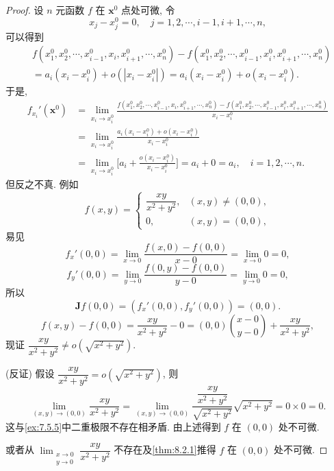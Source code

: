 \begin{proof}
设 $n$ 元函数 $f$ 在 $\boldsymbol{x}^{0}$ 点处可微, 令
\[
  x_{j} - x_{j}^{0} = 0, \quad j = 1, 2, \cdots, i - 1, i + 1, \cdots, n,
\]
可以得到
\begin{align*}
  &f(x_{1}^{0}, x_{2}^{0}, \cdots, x_{i-1}^{0}, x_{i}, x_{i+1}^{0}, \cdots, x_{n}^{0}) - f(x_{1}^{0}, x_{2}^{0}, \cdots, x_{i-1}^{0}, x_{i}^{0}, x_{i+1}^{0}, \cdots, x_{n}^{0}) \\
  &= a_{i}(x_{i} - x_{i}^{0}) + o(|x_{i} - x_{i}^{0}|) = a_{i}(x_{i} - x_{i}^{0}) + o(x_{i} - x_{i}^{0}).
\end{align*}
于是,
\begin{align*}
  f_{x_{i}}'(\boldsymbol{x}^{0})
  &= \lim_{x_{i} \to x_{i}^{0}}\frac{f(x_{1}^{0}, x_{2}^{0}, \cdots, x_{i-1}^{0}, x_{i}, x_{i+1}^{0}, \cdots, x_{n}^{0}) - f(x_{1}^{0}, x_{2}^{0}, \cdots, x_{i-1}^{0}, x_{i}^{0}, x_{i+1}^{0}, \cdots, x_{n}^{0})}{x_{i} - x_{i}^{0}} \\
  &= \lim_{x_{i} \to x_{i}^{0}}\frac{a_{i}(x_{i} - x_{i}^{0}) + o(x_{i} - x_{i}^{0})}{x_{i} - x_{i}^{0}} \\
  &= \lim_{x_{i} \to x_{i}^{0}}\Big[a_{i} + \frac{o(x_{i} - x_{i}^{0})}{x_{i} - x_{i}^{0}}\Big] = a_{i} + 0 = a_{i}, \quad i = 1, 2, \cdots, n.
\end{align*}
但反之不真. 例如
\[
  f(x, y) = \begin{cases}
    \dfrac{xy}{x^{2} + y^{2}}, & (x, y) \neq (0, 0), \\[2.5mm]
    0, & (x, y) = (0, 0),
  \end{cases}
\]
易见
\[
  f_{x}'(0, 0) = \lim_{x \to 0}\frac{f(x, 0) - f(0, 0)}{x - 0} = \lim_{x \to 0}0 = 0,
\]
\[
  f_{y}'(0, 0) = \lim_{y \to 0}\frac{f(0, y) - f(0, 0)}{y - 0} = \lim_{y \to 0}0 = 0,
\]
所以
\[
  \boldsymbol{J}f(0, 0) = (f_{x}'(0, 0), f_{y}'(0, 0)) = (0, 0).
\]
\[
  f(x, y) - f(0, 0) = \frac{xy}{x^{2} + y^{2}} - 0 = (0, 0)\binom{x - 0}{y - 0} + \frac{xy}{x^{2} + y^{2}},
\]
现证 $\dfrac{xy}{x^{2} + y^{2}} \neq o(\sqrt{x^{2} + y^{2}})$.

(反证) 假设 $\dfrac{xy}{x^{2} + y^{2}} = o(\sqrt{x^{2} + y^{2}})$, 则
\[
  \lim_{(x, y) \to (0, 0)}\frac{xy}{x^{2} + y^{2}} = \lim_{(x, y) \to (0, 0)}\frac{\dfrac{xy}{x^{2} + y^{2}}}{\sqrt{x^{2} + y^{2}}}\sqrt{x^{2} + y^{2}} = 0 \times 0 = 0.
\]
这与\cref{ex:7.5.5}中二重极限不存在相矛盾. 由上述得到 $f$ 在 $(0, 0)$ 处不可微.

或者从 $\lim_{\substack{x \to 0 \\ y \to 0}}\dfrac{xy}{x^{2} + y^{2}}$ 不存在及\cref{thm:8.2.1}推得 $f$ 在 $(0, 0)$ 处不可微.
\end{proof}

